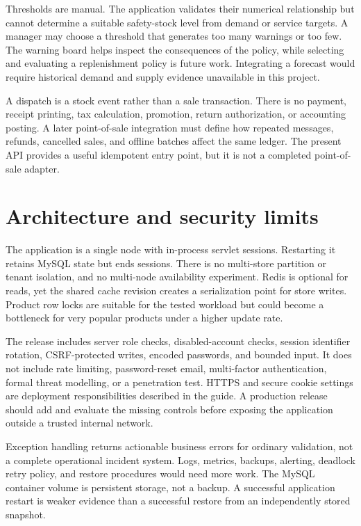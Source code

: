 Thresholds are manual. The application validates their numerical relationship but cannot determine a suitable safety-stock level from demand or service targets. A manager may choose a threshold that generates too many warnings or too few. The warning board helps inspect the consequences of the policy, while selecting and evaluating a replenishment policy is future work. Integrating a forecast would require historical demand and supply evidence unavailable in this project.

A dispatch is a stock event rather than a sale transaction. There is no payment, receipt printing, tax calculation, promotion, return authorization, or accounting posting. A later point-of-sale integration must define how repeated messages, refunds, cancelled sales, and offline batches affect the same ledger. The present API provides a useful idempotent entry point, but it is not a completed point-of-sale adapter.

\section{Architecture and security limits}
The application is a single node with in-process servlet sessions. Restarting it retains MySQL state but ends sessions. There is no multi-store partition or tenant isolation, and no multi-node availability experiment. Redis is optional for reads, yet the shared cache revision creates a serialization point for store writes. Product row locks are suitable for the tested workload but could become a bottleneck for very popular products under a higher update rate.

The release includes server role checks, disabled-account checks, session identifier rotation, CSRF-protected writes, encoded passwords, and bounded input. It does not include rate limiting, password-reset email, multi-factor authentication, formal threat modelling, or a penetration test. HTTPS and secure cookie settings are deployment responsibilities described in the guide. A production release should add and evaluate the missing controls before exposing the application outside a trusted internal network.

Exception handling returns actionable business errors for ordinary validation, not a complete operational incident system. Logs, metrics, backups, alerting, deadlock retry policy, and restore procedures would need more work. The MySQL container volume is persistent storage, not a backup. A successful application restart is weaker evidence than a successful restore from an independently stored snapshot.


